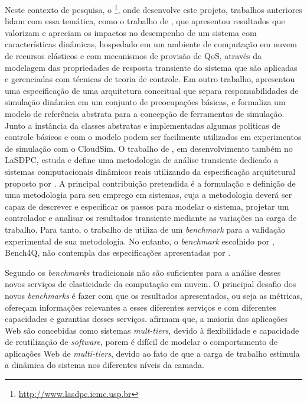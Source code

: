 Neste contexto de pesquisa, o \textit{}\footnote{\url{http://www.lasdpc.icmc.usp.br}}, onde desenvolve este projeto, trabalhos anteriores lidam com essa temática, como o trabalho de , que apresentou resultados que valorizam e apreciam os impactos no desempenho de um sistema com características dinâmicas, hospedado em um ambiente de computação em nuvem de recursos elásticos e com mecanismos de provisão de QoS, através da modelagem das propriedades de resposta transiente do sistema que são aplicadas e gerenciadas com  técnicas de teoria de controle. Em outro trabalho,  apresentou uma especificação de uma arquitetura conceitual que separa responsabilidades de simulação dinâmica em um conjunto de preocupações básicas, e formaliza um modelo de referência abstrata para a concepção de ferramentas de simulação. Junto a instância da classes abstratas e implementadas algumas políticas de controle básicos e com o modelo podem ser facilmente utilizados em experimentos de simulação com o CloudSim. O trabalho de , em desenvolvimento também no LaSDPC, estuda e define uma metodologia de análise transiente dedicado a sistemas computacionais dinâmicos reais utilizando da especificação arquitetural proposto por . A principal contribuição pretendida é a formulação e definição de uma metodologia para seu emprego em sistemas, cuja a metodologia deverá ser capaz de descrever e especificar os passos para modelar o sistema, projetar um controlador e analisar os resultados transiente mediante as variações na carga de trabalho. Para tanto, o trabalho de  utiliza de um \textit{benchmark} para a validação experimental de sua metodologia. No entanto, o \textit{benchmark} escolhido por , Bench4Q, não contempla das especificações apresentadas por .

Segundo  os \textit{benchmarks} tradicionais não são suficientes para a análise desses novos serviços de elasticidade da computação em nuvem. O principal desafio dos novos \textit{benchmarks} é fazer com que os resultados apresentados, ou seja as métricas, ofereçam informações relevantes a esses diferentes serviços e com diferentes capacidades e garantias desses serviços.  afirmam que, a maioria das aplicações Web são concebidas como sistemas \textit{mult-tiers}, devido à flexibilidade e capacidade de reutilização de \textit{software}, porem é difícil de modelar o comportamento de aplicações Web de \textit{multi-tiers}, devido ao fato de que a carga de trabalho estimula a dinâmica do sistema nos diferentes níveis da camada.

